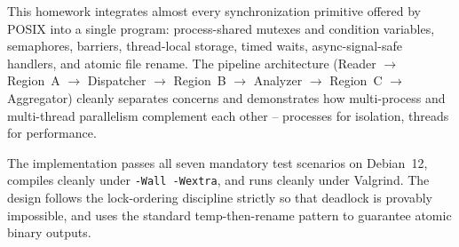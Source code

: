 \documentclass[11pt,a4paper]{article}
\newcommand{\code}[1]{\texttt{\small #1}}
\begin{document}
This homework integrates almost every synchronization primitive offered
by POSIX into a single program: process-shared mutexes and condition
variables, semaphores, barriers, thread-local storage, timed waits,
async-signal-safe handlers, and atomic file rename. The pipeline
architecture (Reader $\to$ Region~A $\to$ Dispatcher $\to$ Region~B
$\to$ Analyzer $\to$ Region~C $\to$ Aggregator) cleanly separates
concerns and demonstrates how multi-process and multi-thread
parallelism complement each other -- processes for isolation, threads
for performance.

The implementation passes all seven mandatory test scenarios on
Debian~12, compiles cleanly under \code{-Wall -Wextra}, and runs
cleanly under Valgrind. The design follows the lock-ordering discipline
strictly so that deadlock is provably impossible, and uses the
standard temp-then-rename pattern to guarantee atomic binary outputs.
\end{document}
